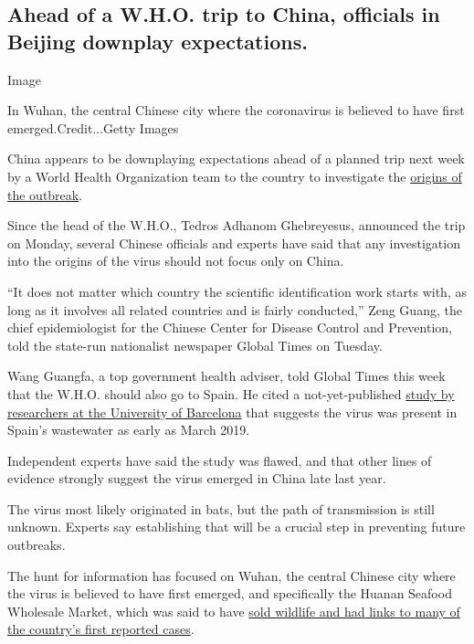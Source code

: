 \hypertarget{ahead-of-a-who-trip-to-china-officials-in-beijing-downplay-expectations}{%
\subsection{Ahead of a W.H.O. trip to China, officials in Beijing
downplay
expectations.}\label{ahead-of-a-who-trip-to-china-officials-in-beijing-downplay-expectations}}

Image

In Wuhan, the central Chinese city where the coronavirus is believed to
have first emerged.Credit...Getty Images

China appears to be downplaying expectations ahead of a planned trip
next week by a World Health Organization team to the country to
investigate the
\href{https://www.nytimes3xbfgragh.onion/article/coronavirus-timeline.html}{origins
of the outbreak}.

Since the head of the W.H.O., Tedros Adhanom Ghebreyesus, announced the
trip on Monday, several Chinese officials and experts have said that any
investigation into the origins of the virus should not focus only on
China.

``It does not matter which country the scientific identification work
starts with, as long as it involves all related countries and is fairly
conducted,'' Zeng Guang, the chief epidemiologist for the Chinese Center
for Disease Control and Prevention, told the state-run nationalist
newspaper Global Times on Tuesday.

Wang Guangfa, a top government health adviser, told Global Times this
week that the W.H.O. should also go to Spain. He cited a
not-yet-published
\href{https://www.nytimes3xbfgragh.onion/2020/06/26/health/coronavirus-spain.html}{study
by researchers at the University of Barcelona} that suggests the virus
was present in Spain's wastewater as early as March 2019.

Independent experts have said the study was flawed, and that other lines
of evidence strongly suggest the virus emerged in China late last year.

The virus most likely originated in bats, but the path of transmission
is still unknown. Experts say establishing that will be a crucial step
in preventing future outbreaks.

The hunt for information has focused on Wuhan, the central Chinese city
where the virus is believed to have first emerged, and specifically the
Huanan Seafood Wholesale Market, which was said to have
\href{https://www.nytimes3xbfgragh.onion/2020/01/25/world/asia/china-markets-coronavirus-sars.html}{sold
wildlife and had links to many of the country's first reported cases}.

